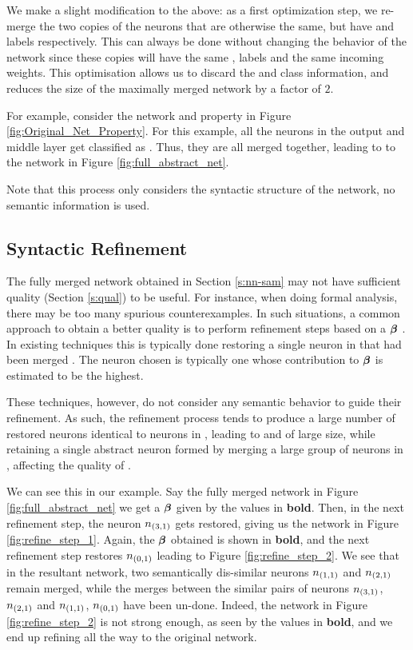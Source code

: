 We make a slight modification to the above: as a first optimization step, we
re-merge the two copies of the \abs neurons that are otherwise the same, but
have \posc and \negc labels respectively. This can always be done without
changing the behavior of the network since these copies will have the same \inc,
\dec labels and the same incoming weights.  This optimisation
allows us to discard the \posc and \negc class information, and reduces the size
of the maximally merged network by a factor of $2$.




For example, consider the network and property in Figure
\ref{fig:Original_Net_Property}. For this example, all the neurons in the output
and middle layer get classified as \inc. Thus, they are all merged together,
leading to to the network in Figure \ref{fig:full_abstract_net}.

Note that this process only considers the syntactic structure of the network, no
semantic information is used.

\subsection{ Syntactic Refinement }

The fully merged network obtained in Section \ref{s:nn-sam} may not have
sufficient quality (Section \ref{s:qual}) to be useful. For instance, when doing
formal analysis, there may be too many spurious counterexamples. In such
situations, a common approach to obtain a better quality \abs is to perform
refinement steps based on a \gencex $\boldsymbol{\beta}$ \cite{cegar-nn,
cegarette, cleverest-nn}. In
existing techniques this is typically done restoring a single neuron in \cnc
that had been merged \abs. The neuron chosen is typically one whose contribution
to $\boldsymbol{\beta}$ is estimated to be the highest.

These techniques, however, do not consider any semantic behavior to guide their
refinement. As such, the refinement process tends to produce a large number of
restored neurons identical to neurons in \cnc, leading to and \abs of large
size, while retaining a single abstract neuron formed by merging a large group
of neurons in \cnc, affecting the quality of \abs. 

We can see this in our example. Say the fully merged network in Figure
\ref{fig:full_abstract_net} we get a $\boldsymbol{\beta}$ given by the values in \textbf{bold}.
Then, in the next refinement step, the neuron $n_{(3,1)}$ gets restored, giving
us the network in Figure \ref{fig:refine_step_1}. Again, the $\boldsymbol{\beta}$
obtained is shown in \textbf{bold}, and the next refinement step restores $n_{(0,1)}$
leading to Figure \ref{fig:refine_step_2}. We see that in the resultant network,
two semantically dis-similar neurons $n_{(1,1)}$ and $n_{(2,1)}$ remain merged,
while the merges between the similar pairs of neurons $n_{(3,1)}$, $n_{(2,1)}$
and $n_{(1,1)}$, $n_{(0,1)}$ have been un-done. Indeed, the network in Figure
\ref{fig:refine_step_2} is not strong enough, as seen by the values in \textbf{bold}, and
we end up refining all the way to the original network.



